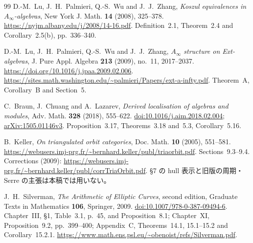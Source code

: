 \begin{thebibliography}{99}
D.-M.~Lu, J.~H.~Palmieri, Q.-S.~Wu and J.~J.~Zhang,
\emph{Koszul equivalences in $A_\infty$-algebras},
New York J. Math. \textbf{14} (2008), 325--378.
\url{https://nyjm.albany.edu/j/2008/14-16.pdf}.
Definition~2.1, Theorem~2.4 and Corollary~2.5(b), pp.~336--340.

D.-M.~Lu, J.~H.~Palmieri, Q.-S.~Wu and J.~J.~Zhang,
\emph{$A_\infty$ structure on Ext-algebras},
J. Pure Appl. Algebra \textbf{213} (2009), no.~11, 2017--2037.
\url{https://doi.org/10.1016/j.jpaa.2009.02.006}.
\url{https://sites.math.washington.edu/~palmieri/Papers/ext-a-infty.pdf}.
Theorem~A, Corollary~B and Section~5.

C.~Braun, J.~Chuang and A.~Lazarev,
\emph{Derived localisation of algebras and modules},
Adv. Math. \textbf{328} (2018), 555--622.
\href{https://doi.org/10.1016/j.aim.2018.02.004}{doi:10.1016/j.aim.2018.02.004};
\href{https://arxiv.org/abs/1505.01146v3}{arXiv:1505.01146v3}.
Proposition~3.17, Theorems~3.18 and~5.3, Corollary~5.16.

B.~Keller,
\emph{On triangulated orbit categories},
Doc. Math. \textbf{10} (2005), 551--581.
\url{https://webusers.imj-prg.fr/~bernhard.keller/publ/triaorbit.pdf}.
Sections~9.3--9.4.
Corrections (2009):
\url{https://webusers.imj-prg.fr/~bernhard.keller/publ/corrTriaOrbit.pdf}.
\S7 の hull 表示と旧版の周期・Serre の主張は本稿では用いない。

J.~H.~Silverman,
\emph{The Arithmetic of Elliptic Curves}, second edition,
Graduate Texts in Mathematics \textbf{106}, Springer, 2009.
\href{https://doi.org/10.1007/978-0-387-09494-6}{doi:10.1007/978-0-387-09494-6}.
Chapter~III, \S1, Table~3.1, p.~45, and Proposition~8.1;
Chapter~XI, Proposition~9.2, pp.~399--400;
Appendix~C, Theorems~14.1, 15.1--15.2 and Corollary~15.2.1.
\url{https://www.math.ens.psl.eu/~obenoist/refs/Silverman.pdf}.



\end{thebibliography}
